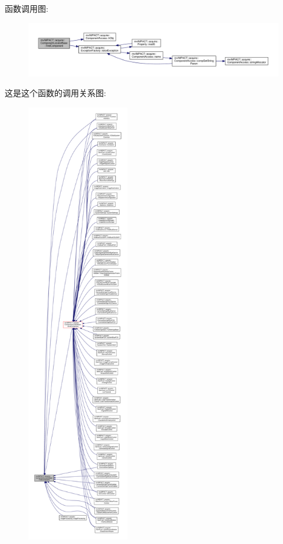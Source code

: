 函数调用图\+:
\nopagebreak
\begin{figure}[H]
\begin{center}
\leavevmode
\includegraphics[width=350pt]{classmv_i_m_p_a_c_t_1_1acquire_1_1_component_locator_base_a2b3d738296e53a5d2a0cc5bdcaa2304b_cgraph}
\end{center}
\end{figure}




这是这个函数的调用关系图\+:
\nopagebreak
\begin{figure}[H]
\begin{center}
\leavevmode
\includegraphics[height=550pt]{classmv_i_m_p_a_c_t_1_1acquire_1_1_component_locator_base_a2b3d738296e53a5d2a0cc5bdcaa2304b_icgraph}
\end{center}
\end{figure}


